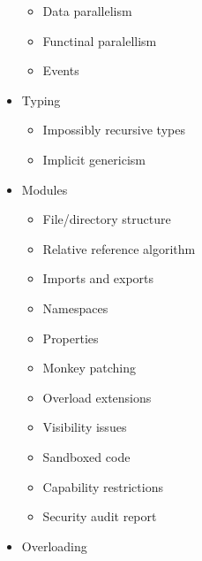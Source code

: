 \begin{itemize}
\begin{itemize}
  \item Data parallelism

  \item Functinal paralellism

  \item Events
    
  \end{itemize}

\item Typing

  \begin{itemize}

  \item Impossibly recursive types

  \item Implicit genericism

  \end{itemize}

\item Modules

  \begin{itemize}

  \item File/directory structure

  \item Relative reference algorithm

  \item Imports and exports

  \item Namespaces

  \item Properties

  \item Monkey patching

  \item Overload extensions

  \item Visibility issues

  \item Sandboxed code

  \item Capability restrictions

  \item Security audit report

  \end{itemize}

\item Overloading

  \begin{itemize}


\end{itemize}
\end{itemize}
